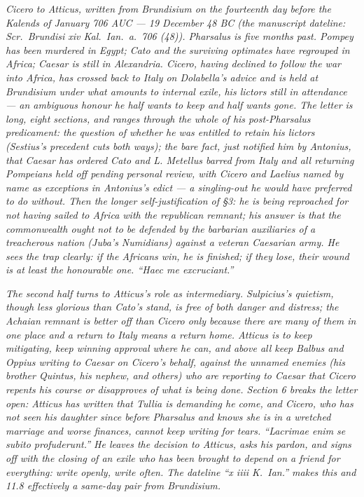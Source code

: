 
\textit{Cicero to Atticus, written from Brundisium on the
fourteenth day before the Kalends of January 706 AUC ---
19 December 48 BC (the manuscript dateline: \textit{Scr.\
Brundisi xiv Kal.\ Ian.\ a.\ 706 (48)}). Pharsalus is
five months past. Pompey has been murdered in Egypt;
Cato and the surviving optimates have regrouped in
Africa; Caesar is still in Alexandria. Cicero, having
declined to follow the war into Africa, has crossed
back to Italy on Dolabella's advice and is held at
Brundisium under what amounts to internal exile, his
lictors still in attendance --- an ambiguous honour
he half wants to keep and half wants gone. The letter
is long, eight sections, and ranges through the whole
of his post-Pharsalus predicament: the question of
whether he was entitled to retain his lictors (Sestius's
precedent cuts both ways); the bare fact, just notified
him by Antonius, that Caesar has ordered Cato and L.
Metellus barred from Italy and all returning Pompeians
held off pending personal review, with Cicero and
Laelius named by name as exceptions in Antonius's edict
--- a singling-out he would have preferred to do without.
Then the longer self-justification of \S3: he is being
reproached for not having sailed to Africa with the
republican remnant; his answer is that the commonwealth
ought not to be defended by the barbarian auxiliaries
of a treacherous nation (Juba's Numidians) against a
veteran Caesarian army. He sees the trap clearly: if
the Africans win, he is finished; if they lose, their
wound is at least the honourable one. ``Haec me
excruciant.''}

\textit{The second half turns to Atticus's role as
intermediary. Sulpicius's quietism, though less
glorious than Cato's stand, is free of both danger
and distress; the Achaian remnant is better off than
Cicero only because there are many of them in one
place and a return to Italy means a return home.
Atticus is to keep mitigating, keep winning approval
where he can, and above all keep Balbus and Oppius
writing to Caesar on Cicero's behalf, against the
unnamed enemies (his brother Quintus, his nephew, and
others) who are reporting to Caesar that Cicero
repents his course or disapproves of what is being
done. Section 6 breaks the letter open: Atticus has
written that Tullia is demanding he come, and Cicero,
who has not seen his daughter since before Pharsalus
and knows she is in a wretched marriage and worse
finances, cannot keep writing for tears. ``\textit{Lacrimae
enim se subito profuderunt.}'' He leaves the
decision to Atticus, asks his pardon, and signs off
with the closing of an exile who has been brought
to depend on a friend for everything: write openly,
write often. The dateline ``x iiii K.\ Ian.'' makes
this and 11.8 effectively a same-day pair from
Brundisium.}
